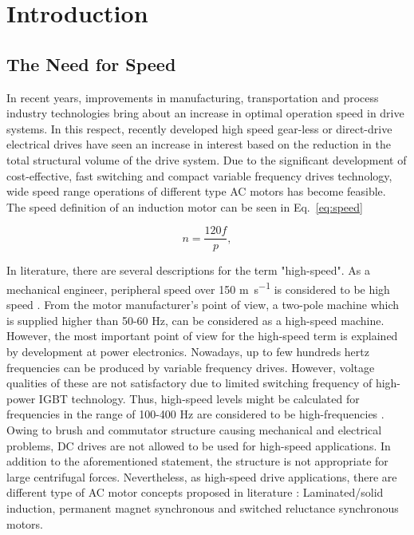\chapter{Introduction}

\section{The Need for Speed}

In recent years, improvements in manufacturing, transportation and process industry
technologies bring about an increase in optimal operation speed in drive systems. In this
respect, recently developed high speed gear-less or direct-drive electrical drives have seen an
increase in interest based on the reduction in the total structural volume of the drive
system. Due to the significant development of cost-effective, fast switching and compact
variable frequency drives technology, wide speed range operations of different type AC motors
has become feasible. The speed definition of an induction motor can be seen in Eq.\ \ref{eq:speed}

\begin{equation}  \label{eq:speed}
  n = \frac{120 f}{p},
\end{equation}

In literature, there are several descriptions for the term "high-speed".  As a mechanical
engineer, peripheral speed over 150 \si{\meter\per\second} is considered to be high speed
\cite{gieras2011performance}. From the motor manufacturer's point of view, a two-pole machine
which is supplied higher than 50-60 \si{\hertz}, can be considered as a high-speed machine.
However, the most important point of view for the high-speed term is explained by development
at power electronics. Nowadays, up to few hundreds hertz frequencies can be produced by
variable frequency drives. However, voltage qualities of these are not satisfactory due to
limited switching frequency of high-power IGBT technology. Thus, high-speed levels might be
calculated for frequencies in the range of 100-400 \si{\hertz} are considered to be
high-frequencies \cite{pyrhonen1991high}.  Owing to brush and commutator structure causing mechanical and
electrical problems, DC drives are not allowed to be used for high-speed applications. In
addition to the aforementioned statement, the structure is not appropriate for large
centrifugal forces.  Nevertheless, as high-speed drive applications, there are different type
of AC motor concepts proposed in literature \cite{gieras2011performance, pyrhonen1991high, lahteenmaki2002design, saari1998thermal}: Laminated/solid induction, permanent
magnet synchronous and switched reluctance synchronous motors.

